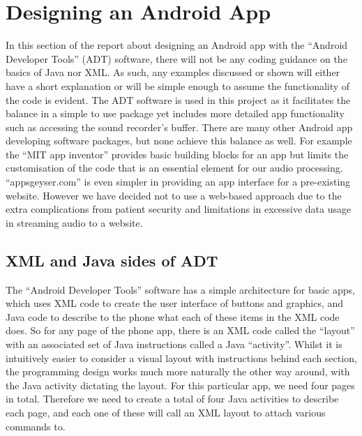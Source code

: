 \section{Designing an Android App}
\label{sec:android-george}
In this section of the report about designing an Android app with the “Android Developer Tools” (ADT) software, there will not be any coding guidance on the basics of Java nor XML. As such, any examples discussed or shown will either have a short explanation or will be simple enough to assume the functionality of the code is evident. The ADT software is used in this project as it facilitates the balance in a simple to use package yet includes more detailed app functionality such as accessing the sound recorder’s buffer. There are many other Android app developing software packages, but none achieve this balance as well. For example the “MIT app inventor” provides basic building blocks for an app but limits the customisation of the code that is an essential element for our audio processing. “appsgeyser.com” is even simpler in providing an app interface for a pre-existing website. However we have decided not to use a web-based approach due to the extra complications from patient security and limitations in excessive data usage in streaming audio to a website.
\subsection{XML and Java sides of ADT}
The “Android Developer Tools” software has a simple architecture for basic apps, which uses XML code to create the user interface of buttons and graphics, and Java code to describe to the phone what each of these items in the XML code does. So for any page of the phone app, there is an XML code called the “layout” with an associated set of Java instructions called a Java “activity”. Whilst it is intuitively easier to consider a visual layout with instructions behind each section, the programming design works much more naturally the other way around, with the Java activity dictating the layout. For this particular app, we need four pages in total. Therefore we need to create a total of four Java activities to describe each page, and each one of these will call an XML layout to attach various commands to.
